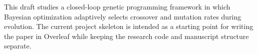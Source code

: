 This draft studies a closed-loop genetic programming framework in which
Bayesian optimization adaptively selects crossover and mutation rates
during evolution. The current project skeleton is intended as a starting
point for writing the paper in Overleaf while keeping the research code
and manuscript structure separate.
